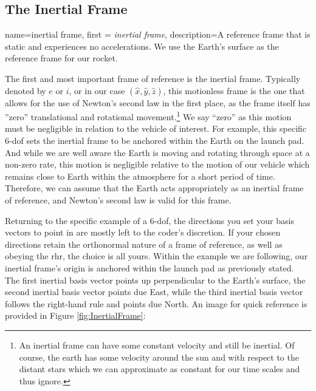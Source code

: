 \documentclass[12pt]{report}
\begin{document}
\subsection{The Inertial Frame}

{
    name=inertial frame,
    first = {\textit{inertial frame}},
    description={A reference frame that is static and experiences no accelerations. We use the Earth's surface as the reference frame for our rocket.}
}

The first and most important frame of reference is the \gls{inertial frame}. Typically denoted by $e$ or $i$, or in our case $(\hat{x},\hat{y},\hat{z})$, this motionless frame is the one that allows for the use of Newton’s second law in the first place, as the frame itself has ''zero'' translational and rotational movement.\footnote{An inertial frame can have some constant velocity and still be inertial. Of course, the earth has some velocity around the sun and with respect to the distant stars which we can approximate as constant for our time scales and thus ignore.} We say “zero” as this motion must be negligible in relation to the vehicle of interest. For example, this specific 6-\gls{dof} sets the inertial frame to be anchored within the Earth on the launch pad. And while we are well aware the Earth is moving and rotating through space at a non-zero rate, this motion is negligible relative to the motion of our vehicle which remains close to Earth within the atmosphere for a short period of time. Therefore, we can assume that the Earth acts appropriately as an inertial frame of reference, and Newton’s second law is valid for this frame. 


Returning to the specific example of a 6-\gls{dof}, the directions you set your basis vectors to point in are mostly left to the coder’s discretion. If your chosen directions retain the orthonormal nature of a frame of reference, as well as obeying the \gls{rhr}, the choice is all yours. Within the example we are following, our inertial frame’s origin is anchored within the launch pad as previously stated. The first inertial basis vector points up perpendicular to the Earth’s surface, the second inertial basis vector points due East, while the third inertial basis vector follows the right-hand rule and points due North. An image for quick reference is provided in Figure \ref{fig:InertialFrame}:
\end{document}
